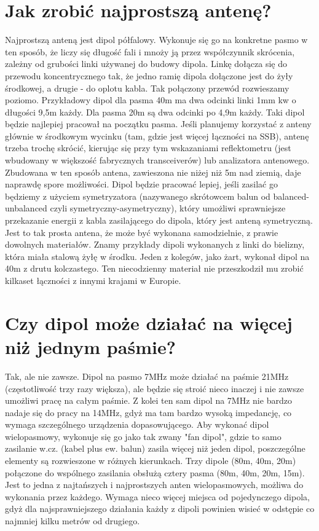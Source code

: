 \documentclass[a4paper,12pt]{article}
\begin{document}
\section{Jak zrobić najprostszą antenę?}
Najprostszą anteną jest dipol półfalowy. Wykonuje się go na konkretne pasmo w ten sposób, że liczy się długość fali i mnoży ją przez współczynnik skrócenia, zależny od grubości linki używanej do budowy dipola. Linkę dołącza się do przewodu koncentrycznego tak, że jedno ramię dipola dołączone jest do żyły środkowej, a drugie - do oplotu kabla. Tak połączony przewód rozwieszamy poziomo. Przykładowy dipol dla pasma 40m ma dwa odcinki linki 1mm kw o długości 9,5m każdy. Dla pasma 20m są dwa odcinki po 4,9m każdy. Taki dipol będzie najlepiej pracował na początku pasma. Jeśli planujemy korzystać z anteny głównie w środkowym wycinku (tam, gdzie jest więcej łączności na SSB), antenę trzeba trochę skrócić, kierując się przy tym wskazaniami reflektometru (jest wbudowany w większość fabrycznych transceiverów) lub analizatora antenowego. Zbudowana w ten sposób antena, zawieszona nie niżej niż 5m nad ziemią, daje naprawdę spore możliwości. Dipol będzie pracować lepiej, jeśli zasilać go będziemy z użyciem symetryzatora (nazywanego skrótowcem balun od balanced-unbalanced czyli symetryczny-asymetryczny), który umożliwi sprawniejsze przekazanie energii z kabla zasilającego do dipola, który jest anteną symetryczną.
Jest to tak prosta antena, że może być wykonana samodzielnie, z prawie dowolnych materiałów. Znamy przykłady dipoli wykonanych z linki do bielizny, która miała stalową żyłę w środku. Jeden z kolegów, jako żart, wykonał dipol na 40m z drutu kolczastego. Ten niecodzienny materiał nie przeszkodził mu zrobić kilkaset łączności z innymi krajami w Europie.

\section{Czy dipol może działać na więcej niż jednym paśmie?}
Tak, ale nie zawsze. Dipol na pasmo 7MHz może działać na paśmie 21MHz (częstotliwość trzy razy większa), ale będzie się stroić nieco inaczej i nie zawsze umożliwi pracę na całym paśmie. Z kolei ten sam dipol na 7MHz nie bardzo nadaje się do pracy na 14MHz, gdyż ma tam bardzo wysoką impedancję, co wymaga szczególnego urządzenia dopasowującego. Aby wykonać dipol wielopasmowy, wykonuje się go jako tak zwany "fan dipol", gdzie to samo zasilanie w.cz. (kabel plus ew. balun) zasila więcej niż jeden dipol, poszczególne elementy są rozwieszone w różnych kierunkach. Trzy dipole (80m, 40m, 20m) połączone do wspólnego zasilania obsłużą cztery pasma (80m, 40m, 20m, 15m). Jest to jedna z najtańszych i najprostszych anten wielopasmowych, możliwa do wykonania przez każdego. Wymaga nieco więcej miejsca od pojedynczego dipola, gdyż dla najsprawniejszego działania każdy z dipoli powinien wisieć w odstępie co najmniej kilku metrów od drugiego.
\end{document}
